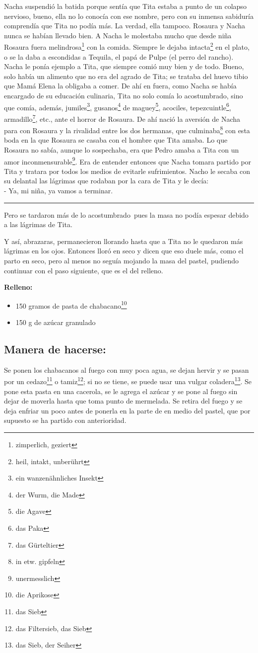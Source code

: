 Nacha suspendió la batida porque sentía que Tita estaba a punto de un
colapso nervioso, bueno, ella no lo conocía con ese nombre, pero con su
inmensa sabiduría comprendía que Tita no podía más. La verdad, ella
tampoco. Rosaura y Nacha nunca se habían llevado bien. A Nacha le
molestaba mucho que desde niña Rosaura fuera melindrosa\footnote{zimperlich, geziert} con la comida.
Siempre le dejaba intacta\footnote{heil, intakt, unberührt} en
el plato, o se la daba a escondidas a Tequila, el papá de Pulpe
(el perro del rancho). Nacha le ponía ejemplo a Tita, que siempre
comió muy bien y de todo. Bueno, solo había un
alimento que no era del agrado de Tita; se trataba del huevo tibio que
Mamá Elena la obligaba a comer. De ahí en fuera, como Nacha se había
encargado de su educación culinaria, Tita no solo comía lo
acostumbrado, sino que comía, además, jumiles\footnote{ein wanzenähnliches Insekt}, gusanos\footnote{der Wurm, die Made} de maguey\footnote{die Agave},
acociles, tepezcuintle\footnote{das Paka}, armadillo\footnote{das Gürteltier}, etc., ante el
horror de Rosaura. De ahí nació la aversión de Nacha para con Rosaura
y la rivalidad entre los dos hermanas, que culminaba\footnote{in etw. gipfeln}
con esta boda en la que Rosaura se casaba
con el hombre que Tita amaba. Lo que Rosaura no sabía, aunque lo
sospechaba, era que Pedro amaba a Tita con un amor inconmensurable\footnote{unermesslich}. Era
de entender entonces que Nacha tomara partido por Tita y tratara por
todos los medios de evitarle sufrimientos. Nacho le secaba con su
delantal las lágrimas que rodaban por la cara de Tita y le decía:
\\- Ya, mi niña, ya vamos a terminar. \\
\rule{1em}{0pt}Pero se tardaron más de lo acostumbrado~pues la masa no podía
espesar debido a las lágrimas de Tita.

Y así, abrazaras, permanecieron llorando hasta que a Tita no le quedaron
más lágrimas en los ojos. Entonces lloró en seco y dicen que eso duele
más, como el parto en seco, pero al menos no seguía mojando la masa del
pastel, pudiendo continuar con el paso siguiente, que es el del relleno.

\textbf{Relleno:}
\begin{itemize}
    \item 150 gramos de pasta de chabacano\footnote{die Aprikose}
    \item 150 g de azúcar granulado
\end{itemize}

\subsection*{ Manera de hacerse: }
Se ponen los chabacanos al fuego con muy poca agua, se dejan hervir y se
pasan por un cedazo\footnote{das Sieb} o tamiz\footnote{das Filtersieb, das Sieb};
si no se tiene, se puede usar una vulgar coladera\footnote{das Sieb, der Seiher}.
Se pone esta pasta en una cacerola, se le agrega el azúcar y se pone al
fuego sin dejar de moverla hasta que toma punto de mermelada.
Se retira del fuego y se deja enfriar un poco antes de ponerla en la
parte de en medio del pastel, que por supuesto se ha partido con
anterioridad.


